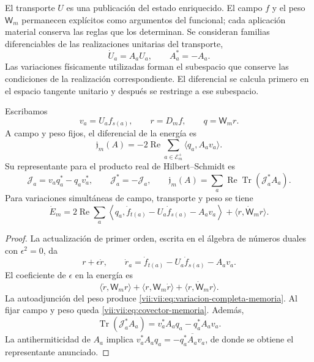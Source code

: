 El transporte \(U\) es una publicación del estado enriquecido. El campo
\(f\) y el peso \(\mathsf W_m\) permanecen explícitos como argumentos
del funcional; cada aplicación material conserva las reglas que los
determinan. Se consideran familias diferenciables de las realizaciones
unitarias del transporte,
\[
 \dot U_a=A_aU_a,\qquad A_a^*=-A_a.
\]
Las variaciones físicamente utilizadas forman el subespacio que conserve
las condiciones de la realización correspondiente. El diferencial se
calcula primero en el espacio tangente unitario y después se restringe
a ese subespacio.

\begin{proposition}
\label{vii:vii:prop:covector-memoria}
Escribamos
\[
 v_a=U_af_{s(a)},\qquad r=D_mf,\qquad q=\mathsf W_mr.
\]
A campo y peso fijos, el diferencial de la energía es
\begin{equation}
 \mathfrak j_m(A)=-2\operatorname{Re}
       \sum_{a\in\mathcal E_m^+}\langle q_a,A_av_a\rangle .
 \label{vii:vii:eq:covector-memoria}
\end{equation}
Su representante para el producto real de Hilbert--Schmidt es
\begin{equation}
 \mathcal J_a=v_aq_a^*-q_av_a^*,\qquad
 \mathcal J_a^*=-\mathcal J_a,\qquad
 \mathfrak j_m(A)=
 \sum_a\operatorname{Re}\operatorname{Tr}(\mathcal J_a^*A_a).
 \label{vii:vii:eq:representante-corriente-discreta}
\end{equation}
Para variaciones simultáneas de campo, transporte y peso se tiene
\begin{equation}
 \dot E_m=
 2\operatorname{Re}\sum_a
 \left\langle q_a,\dot f_{t(a)}-U_a\dot f_{s(a)}-A_av_a\right\rangle
 +\langle r,\dot{\mathsf W}_mr\rangle .
 \label{vii:vii:eq:variacion-completa-memoria}
\end{equation}
\end{proposition}

\begin{proof}
La actualización de primer orden, escrita en el álgebra de números
duales con \(\epsilon^2=0\), da
\[
 r+\epsilon\dot r,\qquad
 \dot r_a=\dot f_{t(a)}-U_a\dot f_{s(a)}-A_av_a.
\]
El coeficiente de \(\epsilon\) en la energía es
\[
 \langle\dot r,\mathsf W_mr\rangle+
 \langle r,\mathsf W_m\dot r\rangle+
 \langle r,\dot{\mathsf W}_mr\rangle.
\]
La autoadjunción del peso produce
\eqref{vii:vii:eq:variacion-completa-memoria}. Al fijar campo y peso queda
\eqref{vii:vii:eq:covector-memoria}. Además,
\[
 \operatorname{Tr}(\mathcal J_a^*A_a)
 =v_a^*A_aq_a-q_a^*A_av_a.
\]
La antihermiticidad de \(A_a\) implica
\(v_a^*A_aq_a=-\overline{q_a^*A_av_a}\), de donde se obtiene
el representante anunciado.
\end{proof}

